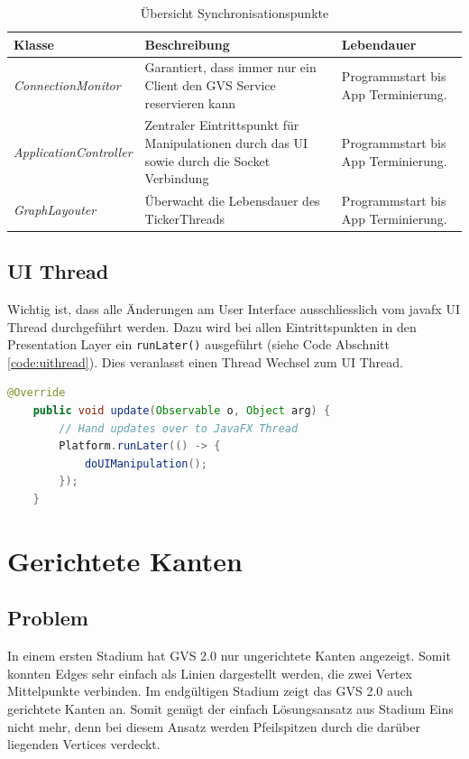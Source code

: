 \documentclass[11pt,a4paper,english,oneside]{book}
\numberwithin{equation}{chapter}
\begin{document}
	\begin{table}[h!]
		\centering
		\begin{tabularx}{\linewidth}{l X X}
			\toprule 
			Klasse & Beschreibung & Lebendauer \\
			\midrule
			\textit{ConnectionMonitor} & Garantiert, dass immer nur ein Client den GVS Service reservieren kann & Programmstart bis App Terminierung. \\
			\textit{ApplicationController} & Zentraler Eintrittspunkt für Manipulationen durch das UI sowie durch die Socket Verbindung & Programmstart bis App Terminierung. \\
			\textit{GraphLayouter} & Überwacht die Lebensdauer des TickerThreads & Programmstart bis App Terminierung. \\
			\bottomrule 
		\end{tabularx} 
		\caption{Übersicht Synchronisationspunkte} 
			\label{tbl:sync-pt}
	\end{table}
	
	\subsection{UI Thread}
	Wichtig ist, dass alle Änderungen am User Interface ausschliesslich vom \gls{javafx} UI Thread durchgeführt werden. Dazu wird bei allen Eintrittspunkten in den Presentation Layer ein \lstinline|runLater()| ausgeführt (siehe Code Abschnitt \ref{code:uithread}). Dies veranlasst einen Thread Wechsel zum UI Thread. 
	
	\clearpage
	
	\begin{lstlisting}[language=java, frame=single, caption={Java FX UI Thread}, label={code:uithread}]
	@Override
	public void update(Observable o, Object arg) {
		// Hand updates over to JavaFX Thread
		Platform.runLater(() -> {
			doUIManipulation();
		});
	}
	\end{lstlisting}
	
	
	
	\section{Gerichtete Kanten}
	\subsection{Problem}
	In einem ersten Stadium hat GVS 2.0 nur ungerichtete Kanten angezeigt. Somit konnten Edges sehr einfach als Linien dargestellt werden, die zwei Vertex Mittelpunkte verbinden. Im endgültigen Stadium zeigt das GVS 2.0 auch gerichtete Kanten an. Somit genügt der einfach Lösungsansatz aus Stadium Eins nicht mehr, denn bei diesem Ansatz werden Pfeilspitzen durch die darüber liegenden Vertices verdeckt.
	
\end{document}
